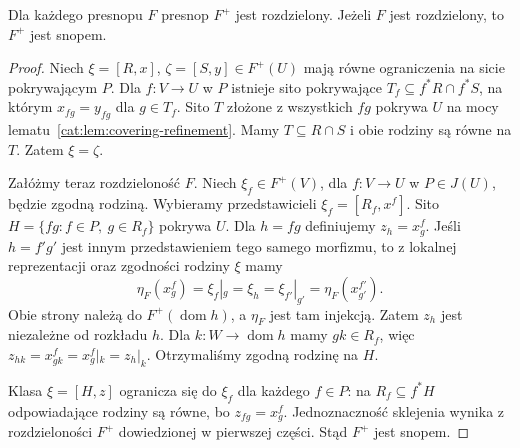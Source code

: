 \begin{twierdzenie}\label{cat:thm:plus-separated}
Dla każdego presnopu $F$ presnop $F^+$ jest rozdzielony. Jeżeli $F$ jest rozdzielony, to $F^+$ jest snopem.
\end{twierdzenie}
\begin{proof}
Niech $\xi=[R,x]$, $\zeta=[S,y]\in F^+(U)$ mają równe ograniczenia na sicie pokrywającym $P$. Dla $f:V\to U$ w $P$ istnieje sito pokrywające $T_f\subseteq f^*R\cap f^*S$, na którym $x_{fg}=y_{fg}$ dla $g\in T_f$. Sito $T$ złożone z wszystkich $fg$ pokrywa $U$ na mocy lematu~\ref{cat:lem:covering-refinement}. Mamy $T\subseteq R\cap S$ i obie rodziny są równe na $T$. Zatem $\xi=\zeta$.

Załóżmy teraz rozdzieloność $F$. Niech $\xi_f\in F^+(V)$, dla $f:V\to U$ w $P\in J(U)$, będzie zgodną rodziną. Wybieramy przedstawicieli $\xi_f=[R_f,x^f]$. Sito $H=\{fg:f\in P,\ g\in R_f\}$ pokrywa $U$. Dla $h=fg$ definiujemy $z_h=x^f_g$. Jeśli $h=f'g'$ jest innym przedstawieniem tego samego morfizmu, to z lokalnej reprezentacji oraz zgodności rodziny $\xi$ mamy
\[
 \eta_F(x^f_g)=\xi_f|_g=\xi_h
 =\xi_{f'}|_{g'}=\eta_F(x^{f'}_{g'}).
\]
Obie strony należą do $F^+(\operatorname{dom}h)$, a $\eta_F$ jest tam injekcją. Zatem $z_h$ jest niezależne od rozkładu $h$. Dla $k:W\to\operatorname{dom}h$ mamy $gk\in R_f$, więc $z_{hk}=x^f_{gk}=x^f_g|_k=z_h|_k$. Otrzymaliśmy zgodną rodzinę na $H$.

Klasa $\xi=[H,z]$ ogranicza się do $\xi_f$ dla każdego $f\in P$: na $R_f\subseteq f^*H$ odpowiadające rodziny są równe, bo $z_{fg}=x^f_g$. Jednoznaczność sklejenia wynika z rozdzieloności $F^+$ dowiedzionej w pierwszej części. Stąd $F^+$ jest snopem.
\end{proof}

